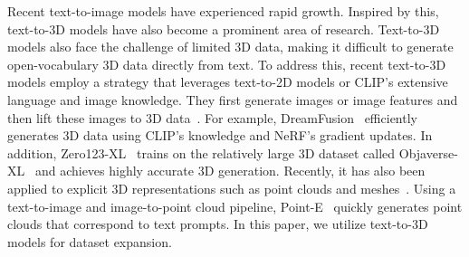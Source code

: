  Recent text-to-image models have experienced rapid growth. Inspired by this, text-to-3D models have also become a prominent area of research. 
Text-to-3D models also face the challenge of limited 3D data, making it difficult to generate open-vocabulary 3D data directly from text. To address this, recent text-to-3D models employ a strategy that leverages text-to-2D models or CLIP's extensive language and image knowledge. They first generate images or image features and then lift these images to 3D data~\cite{poole2022dreamfusion, lin2023magic3d, chen2023fantasia3d, wang2024prolificdreamer, tsalicoglou2024textmesh}.
For example, DreamFusion~\cite{poole2022dreamfusion} efficiently generates 3D data using CLIP's knowledge and NeRF's gradient updates.
In addition, Zero123-XL~\cite{liu2023zero} trains on the relatively large 3D dataset called Objaverse-XL~\cite{deitke2024objaverse} and achieves highly accurate 3D generation. Recently, it has also been applied to explicit 3D representations such as point clouds and meshes~\cite{nichol2022point, jun2023shap}. Using a text-to-image and image-to-point cloud pipeline, Point-E~\cite{nichol2022point} quickly generates point clouds that correspond to text prompts.
In this paper, we utilize text-to-3D models for dataset expansion.

